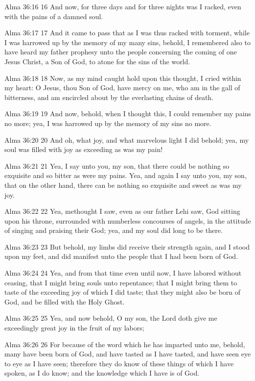 Alma 36:16
 16 And now, for three days and for three nights was I racked,
even with the pains of a damned soul.

Alma 36:17
 17 And it came to pass that as I was thus racked with torment,
while I was harrowed up by the memory of my many sins, behold, I
remembered also to have heard my father prophesy unto the people
concerning the coming of one Jesus Christ, a Son of God, to atone
for the sins of the world.

Alma 36:18
 18 Now, as my mind caught hold upon this thought, I cried within
my heart: O Jesus, thou Son of God, have mercy on me, who am in
the gall of bitterness, and am encircled about by the everlasting
chains of death.

Alma 36:19
 19 And now, behold, when I thought this, I could remember my
pains no more; yea, I was harrowed up by the memory of my sins no
more.

Alma 36:20
 20 And oh, what joy, and what marvelous light I did behold; yea,
my soul was filled with joy as exceeding as was my pain!

Alma 36:21
 21 Yea, I say unto you, my son, that there could be nothing so
exquisite and so bitter as were my pains. Yea, and again I say
unto you, my son, that on the other hand, there can be nothing so
exquisite and sweet as was my joy.

Alma 36:22
 22 Yea, methought I saw, even as our father Lehi saw, God
sitting upon his throne, surrounded with numberless concourses of
angels, in the attitude of singing and praising their God; yea,
and my soul did long to be there.

Alma 36:23
 23 But behold, my limbs did receive their strength again, and I
stood upon my feet, and did manifest unto the people that I had
been born of God.

Alma 36:24
 24 Yea, and from that time even until now, I have labored
without ceasing, that I might bring souls unto repentance; that I
might bring them to taste of the exceeding joy of which I did
taste; that they might also be born of God, and be filled with
the Holy Ghost.

Alma 36:25
 25 Yea, and now behold, O my son, the Lord doth give me
exceedingly great joy in the fruit of my labors;

Alma 36:26
 26 For because of the word which he has imparted unto me,
behold, many have been born of God, and have tasted as I have
tasted, and have seen eye to eye as I have seen; therefore they
do know of these things of which I have spoken, as I do know; and
the knowledge which I have is of God.

